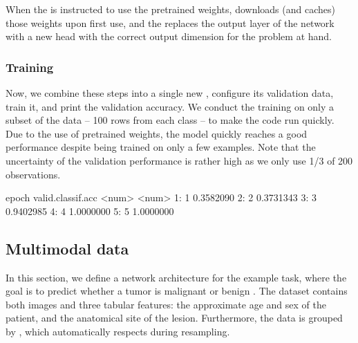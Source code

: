 \documentclass[article,shortnames]{jss}
\theoremstyle{definition}
\renewenvironment{CodeChunk}{\par\addvspace{0.6\baselineskip}\noindent\begin{minipage}{\linewidth}}{\end{minipage}\par\vspace{0.6\baselineskip}}
\begin{document}
When the  is instructed to use the pretrained weights,  downloads (and caches) those weights upon first use, and the \mlrttorch{}  replaces the output layer of the network with a new head with the correct output dimension for the problem at hand.

\subsubsection{Training}

Now, we combine these steps into a single new , configure its validation data, train it, and print the validation accuracy.
We conduct the training on only a subset of the data -- 100 rows from each class -- to make the code run quickly.
Due to the use of pretrained weights, the model quickly reaches a good performance despite being trained on only a few examples.
Note that the uncertainty of the validation performance is rather high as we only use 1/3 of 200 observations.

\begin{CodeChunk}
\begin{CodeOutput}
   epoch valid.classif.acc
   <num>             <num>
1:     1         0.3582090
2:     2         0.3731343
3:     3         0.9402985
4:     4         1.0000000
5:     5         1.0000000
\end{CodeOutput}
\end{CodeChunk}

\subsection{Multimodal data}\label{sec:multimodal}

In this section, we define a network architecture for the  example task, where the goal is to predict whether a tumor is malignant or benign \citep{ref-rotemberg2021melanoma}.
The dataset contains both images and three tabular features: the approximate age and sex of the patient, and the anatomical site of the lesion.
Furthermore, the data is grouped by , which  automatically respects during resampling.
\end{document}
